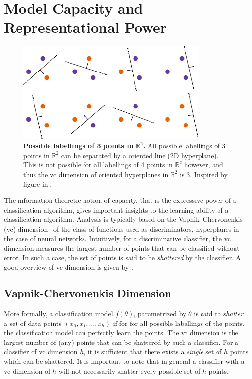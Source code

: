 \documentclass[thesis]{subfiles}
\begin{document}
    \section{Model Capacity and Representational Power}
    \begin{figure}[tbp]
        \centering
        \includegraphics[width=0.85\textwidth]{Figs/PDF/allpossibler3}
        \caption[Possible labellings of 3 points in $\mathbb{R}^2$. ]{\textbf{Possible labellings of 3 points in $\mathbb{R}^2$.} All possible labellings of 3 points in $\mathbb{R}^2$ can be separated by a oriented line (2D hyperplane). This is not possible for all labellings of 4 points in $\mathbb{R}^2$ however, and thus the \gls{vc} dimension of oriented hyperplanes in $\mathbb{R}^2$ is 3. Inspired by figure in \citet{burges1998tutorial}.}\label{fig:vcdim_r2line}
    \end{figure}
    The information theoretic notion of capacity, that is the expressive power of a classification algorithm, gives important insights to the learning ability of a classification algorithm. Analysis is typically based on the Vapnik–Chervonenkis (\gls{vc}) dimension~\citep{vapnik2015uniform} of the class of functions used as discriminators, \eg hyperplanes in the case of neural networks. Intuitively, for a discriminative classifier, the \gls{vc} dimension measures the largest number of points that can be classified without error. In such a case, the set of points is said to be \emph{shattered} by the classifier. A good overview of \gls{vc} dimension is given by \citet{burges1998tutorial}.
    
    \subsection{Vapnik-Chervonenkis Dimension}
    More formally, a classification model $f(\theta)$, parametrized by $\theta$ is said to \emph{shatter} a set of data points $(x_0, x_1, \ldots, x_h)$ if for for all possible labellings of the points, the classification model can perfectly learn the points. The \gls{vc} dimension is the largest number of (any) points that can be shattered by such a classifier. For a classifier of \gls{vc} dimension $h$, it is sufficient that there exists a \emph{single} set of $h$ points which can be shattered. It is important to note that in general a classifier with a \gls{vc} dimension of $h$ will not necessarily shatter every possible set of $h$ points. 
    
\end{document}
